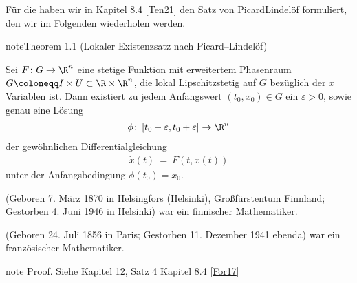 \documentclass[letterpaper,10pt,german]{jupyterBook}
\begin{document}
\sphinxAtStartPar
Für die  haben wir in Kapitel 8.4 {[}\hyperlink{cite.references:id15}{Ten21}{]} den Satz von Picard\sphinxhyphen{}Lindelöf formuliert, den wir im Folgenden wiederholen werden.
\label{ode/repetition:thm:piclindlokal}
\begin{sphinxadmonition}{note}{Theorem 1.1 (Lokaler Existenzsatz nach Picard–Lindelöf)}



\sphinxAtStartPar
Sei \(F\colon G\to\R^n\) eine stetige Funktion mit erweitertem Phasenraum \(G \coloneqq I \times U \subset \R\times\R^n\), die lokal Lipschitz\sphinxhyphen{}stetig auf \(G\) bezüglich der \(x\)\sphinxhyphen{}Variablen ist.
Dann existiert zu jedem Anfangswert \((t_0,x_0) \in G\) ein \(\varepsilon>0\), sowie genau eine Lösung
\begin{equation*}
\begin{split}\phi \colon \left[t_0-\varepsilon, t_0+\varepsilon\right] \to \R^n\end{split}
\end{equation*}
\sphinxAtStartPar
der gewöhnlichen Differentialgleichung
\begin{equation*}
\begin{split}\dot{x}(t) \ = \ F(t,x(t))\end{split}
\end{equation*}
\sphinxAtStartPar
unter der Anfangsbedingung \(\phi(t_0)=x_0\).
\end{sphinxadmonition}

\begin{sphinxShadowBox}

\sphinxAtStartPar
{} (Geboren 7. März 1870 in Helsingfors (Helsinki), Großfürstentum Finnland; Gestorben 4. Juni 1946 in Helsinki) war ein finnischer Mathematiker.
\end{sphinxShadowBox}

\begin{sphinxShadowBox}

\sphinxAtStartPar
{} (Geboren 24. Juli 1856 in Paris; Gestorben 11. Dezember 1941 ebenda) war ein französischer Mathematiker.
\end{sphinxShadowBox}

\begin{sphinxadmonition}{note}
\sphinxAtStartPar
Proof. Siehe Kapitel 12, Satz 4 Kapitel 8.4 {[}\hyperlink{cite.references:id4}{For17}{]}
\end{sphinxadmonition}
\end{document}
